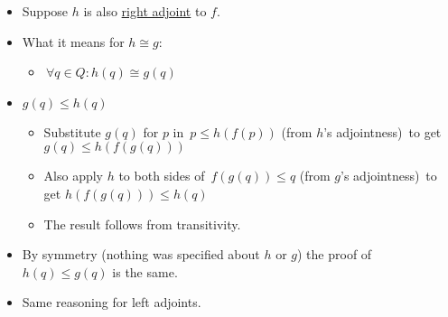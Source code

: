 \begin{itemize}
    \item Suppose $h$ is also \href{doc/1 math/Seven Sketches in Compositionality/Chapter 1: Generative Effects/6 Galois connections/1 Definition and examples/Galois connection}{right adjoint} to $f$.
    \item What it means for $h \cong g$:
          \begin{itemize}
            \item \,$\forall q \in Q:  h(q) \cong g(q)$\,
          \end{itemize}
    \item $g(q) \leq h(q)$
      \begin{itemize}
      \item Substitute $g(q)$ for $p$ in \,$p \leq h(f(p))$ (from $h$'s adjointness)\, to get $g(q) \leq h(f(g(q)))$
      \item Also apply $h$ to both sides of \,$f(g(q)) \leq q$ (from $g$'s adjointness)\, to get $h(f(g(q)))\leq h(q)$
      \item The result follows from transitivity.
      \end{itemize}
    \item By symmetry (nothing was specified about $h$ or $g$) the proof of $h(q)\leq g(q)$ is the same.
    \item Same reasoning for left adjoints.
  \end{itemize}